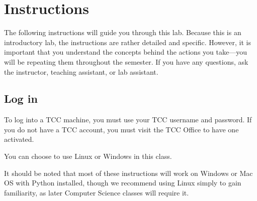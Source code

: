 \documentclass[12pt,hidelinks]{article}
\begin{document}


\pagebreak
\section{Instructions}

The following instructions will guide you through this lab. Because this is an introductory lab, the instructions are rather detailed and specific. However, it is important that you understand the concepts behind the actions you take---you will be repeating them throughout the semester. If you have any questions, ask the instructor, teaching assistant, or lab assistant.

\subsection{Log in}
To log into a TCC machine, you must use your TCC username and password. If you
do not have a TCC account, you must visit the TCC Office to have one activated.

You can choose to use Linux or Windows in this class. 

It should be noted that most of these instructions will work on Windows or Mac
OS with Python installed, though we recommend using Linux simply to gain
familiarity, as later Computer Science classes will require it.
\end{document}
